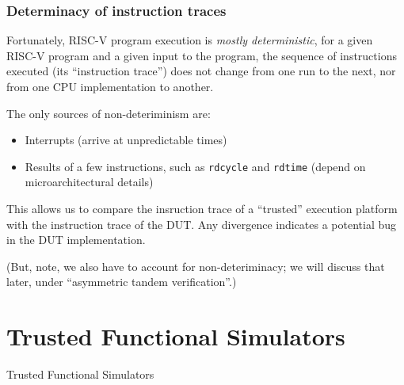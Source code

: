 \begin{frame}[fragile]
\frametitle{Determinacy of instruction traces}

\footnotesize

Fortunately, RISC-V program execution is \emph{mostly deterministic},
{\ie} for a given RISC-V program and a given input to the program, the
sequence of instructions executed (its ``instruction trace'') does not
change from one run to the next, nor from one CPU implementation to
another.

\PAUSE{\vxx}

The only sources of non-deteriminism are:

\begin{itemize}
    \item Interrupts (arrive at unpredictable times)

    \vx

    \item Results of a few instructions, such as {\tt rdcycle} and
        {\tt rdtime} (depend on microarchitectural details)

\end{itemize}

\vxx

This allows us to compare the insruction trace of a ``trusted''
execution platform with the instruction trace of the DUT.  Any
divergence indicates a potential bug in the DUT implementation.

\vxxxx

(But, note, we also have to account for non-deteriminacy; we will
discuss that later, under ``asymmetric tandem verification''.)

\end{frame}


\section{Trusted Functional Simulators}

\begin{frame}

\begin{center}
  {\LARGE Trusted Functional Simulators}
\end{center}

\end{frame}


